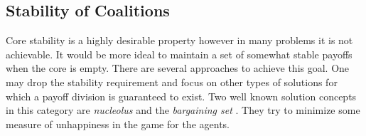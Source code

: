 




        \subsection{Stability of Coalitions}

        Core stability is a highly desirable property however in many problems it is not achievable. It would be more ideal to maintain a set of somewhat stable payoffs when the core is empty. There are several approaches to achieve this goal. One may drop the stability requirement and focus on other types of solutions for which a payoff division is guaranteed to exist. Two well known solution concepts in this category are \emph{nucleolus} \cite{schmeidler_nucleolus_1969} and the \emph{bargaining set} \cite{Davis67existenceof}. They try to minimize some measure of unhappiness in the game for the agents.

